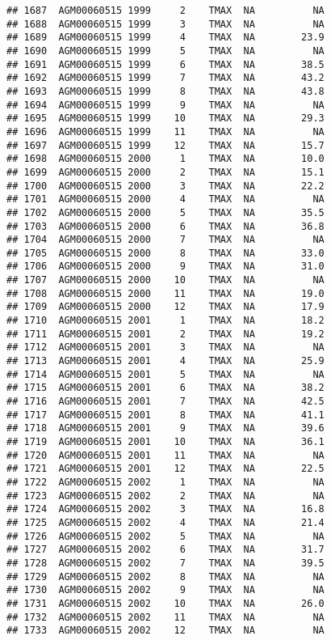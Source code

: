 \documentclass{article}\usepackage[]{graphicx}\usepackage[]{color}
\makeatletter
\newenvironment{kframe}{%
 \def\at@end@of@kframe{}%
 \ifinner\ifhmode%
  \def\at@end@of@kframe{\end{minipage}}%
  \begin{minipage}{\columnwidth}%
 \fi\fi%
 \def\FrameCommand##1{\hskip\@totalleftmargin \hskip-\fboxsep
 \colorbox{shadecolor}{##1}\hskip-\fboxsep
     \hskip-\linewidth \hskip-\@totalleftmargin \hskip\columnwidth}%
 \MakeFramed {\advance\hsize-\width
   \@totalleftmargin\z@ \linewidth\hsize
   \@setminipage}}%
 {\par\unskip\endMakeFramed%
 \at@end@of@kframe}
\newenvironment{knitrout}{}{} %
\makeatother
\begin{document}
\begin{knitrout}
\begin{kframe}
\begin{verbatim}
## 1687  AGM00060515 1999     2    TMAX  NA          NA
## 1688  AGM00060515 1999     3    TMAX  NA          NA
## 1689  AGM00060515 1999     4    TMAX  NA        23.9
## 1690  AGM00060515 1999     5    TMAX  NA          NA
## 1691  AGM00060515 1999     6    TMAX  NA        38.5
## 1692  AGM00060515 1999     7    TMAX  NA        43.2
## 1693  AGM00060515 1999     8    TMAX  NA        43.8
## 1694  AGM00060515 1999     9    TMAX  NA          NA
## 1695  AGM00060515 1999    10    TMAX  NA        29.3
## 1696  AGM00060515 1999    11    TMAX  NA          NA
## 1697  AGM00060515 1999    12    TMAX  NA        15.7
## 1698  AGM00060515 2000     1    TMAX  NA        10.0
## 1699  AGM00060515 2000     2    TMAX  NA        15.1
## 1700  AGM00060515 2000     3    TMAX  NA        22.2
## 1701  AGM00060515 2000     4    TMAX  NA          NA
## 1702  AGM00060515 2000     5    TMAX  NA        35.5
## 1703  AGM00060515 2000     6    TMAX  NA        36.8
## 1704  AGM00060515 2000     7    TMAX  NA          NA
## 1705  AGM00060515 2000     8    TMAX  NA        33.0
## 1706  AGM00060515 2000     9    TMAX  NA        31.0
## 1707  AGM00060515 2000    10    TMAX  NA          NA
## 1708  AGM00060515 2000    11    TMAX  NA        19.0
## 1709  AGM00060515 2000    12    TMAX  NA        17.9
## 1710  AGM00060515 2001     1    TMAX  NA        18.2
## 1711  AGM00060515 2001     2    TMAX  NA        19.2
## 1712  AGM00060515 2001     3    TMAX  NA          NA
## 1713  AGM00060515 2001     4    TMAX  NA        25.9
## 1714  AGM00060515 2001     5    TMAX  NA          NA
## 1715  AGM00060515 2001     6    TMAX  NA        38.2
## 1716  AGM00060515 2001     7    TMAX  NA        42.5
## 1717  AGM00060515 2001     8    TMAX  NA        41.1
## 1718  AGM00060515 2001     9    TMAX  NA        39.6
## 1719  AGM00060515 2001    10    TMAX  NA        36.1
## 1720  AGM00060515 2001    11    TMAX  NA          NA
## 1721  AGM00060515 2001    12    TMAX  NA        22.5
## 1722  AGM00060515 2002     1    TMAX  NA          NA
## 1723  AGM00060515 2002     2    TMAX  NA          NA
## 1724  AGM00060515 2002     3    TMAX  NA        16.8
## 1725  AGM00060515 2002     4    TMAX  NA        21.4
## 1726  AGM00060515 2002     5    TMAX  NA          NA
## 1727  AGM00060515 2002     6    TMAX  NA        31.7
## 1728  AGM00060515 2002     7    TMAX  NA        39.5
## 1729  AGM00060515 2002     8    TMAX  NA          NA
## 1730  AGM00060515 2002     9    TMAX  NA          NA
## 1731  AGM00060515 2002    10    TMAX  NA        26.0
## 1732  AGM00060515 2002    11    TMAX  NA          NA
## 1733  AGM00060515 2002    12    TMAX  NA          NA

\end{verbatim}
\end{kframe}
\end{knitrout}
\end{document}
